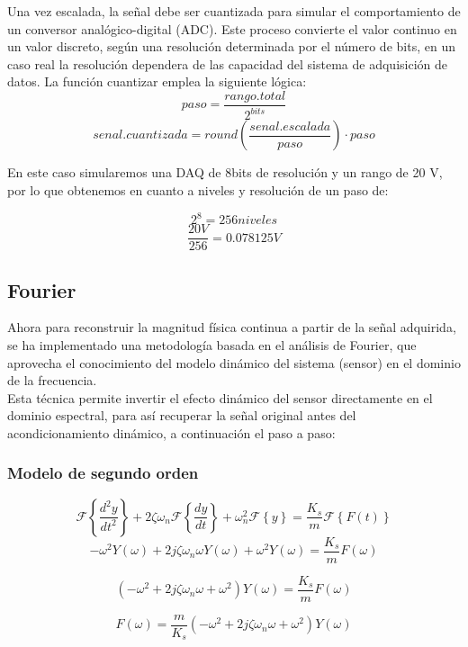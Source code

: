 \documentclass[conference]{IEEEtran}
\begin{document}
Una vez escalada, la señal debe ser cuantizada para simular el comportamiento de un conversor analógico-digital (ADC). Este proceso convierte el valor continuo en un valor discreto, según una resolución determinada por el número de bits, en un caso real la resolución dependera de las capacidad del sistema de adquisición de datos. La función cuantizar emplea la siguiente lógica:\\

\[
paso = \frac{rango.total}{2^{bits}}
\]
\[
senal.cuantizada = round(\frac{senal.escalada}{paso})\cdot paso
\]

En este caso simularemos una DAQ de 8bits de resolución y un rango de 20 V, por lo que obtenemos en cuanto a niveles y resolución de un paso de:


\[
2^{8}=256 niveles
\]
\[
\frac{20V}{256}=0.078125 V
\]



\subsection{Fourier}

Ahora para reconstruir la magnitud física continua a partir de la señal adquirida, se ha implementado una metodología basada en el análisis de Fourier, que aprovecha el conocimiento del modelo dinámico del sistema (sensor) en el dominio de la frecuencia.\\

Esta técnica permite invertir el efecto dinámico del sensor directamente en el dominio espectral, para así recuperar la señal original antes del acondicionamiento dinámico, a continuación el paso a paso:\\

\subsubsection{Modelo de segundo orden}
\[
	\mathcal{F}\left\{ \frac{d^2y}{dt^2} \right\} + 2\zeta\omega_n \mathcal{F}\left\{\frac{dy}{dt}\right\} + \omega_n^2 \mathcal{F}\left\{y\right\} = \frac{K_s}{m} \mathcal{F}\left\{F(t)\right\}
\]
\[
	-\omega^2 Y(\omega)  + 2j\zeta\omega_n\omega Y(\omega) + \omega^2 Y(\omega) = \frac{K_s}{m}F(\omega)
\]
	
\[
	\left(-\omega^2  + 2j\zeta\omega_n\omega + \omega^2 \right) Y(\omega) = \frac{K_s}{m} F(\omega)
\]

\[
	F(\omega) = \frac{m}{K_s}  \left(-\omega^2  + 2j\zeta\omega_n\omega + \omega^2 \right) Y(\omega)
\]
\end{document}
